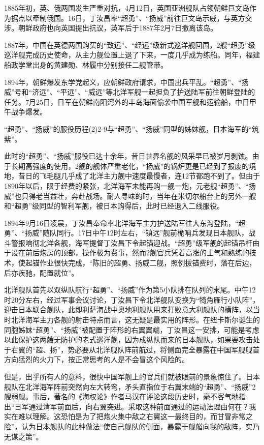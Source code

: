 \documentclass[12pt,UTF8]{ctexbook}
\begin{document}
1885年初，英、俄两国发生严重对抗，4月12日，英国亚洲舰队占领朝鲜巨文岛作为据点以牵制俄国。16日，丁汝昌率“超勇”、“扬威”前往巨文岛示威，与英方交涉。朝鲜政府也向英国提出抗议，英军后于1887年2月7日撤离该岛。

1887年，中国在英德两国购买的“致远”、“经远”级新式巡洋舰回国，2艘“超勇”级巡洋舰完成历史使命，从主力舰位置上退了下来，一度几乎成为练船。同年，福建船政学堂出身的黄建勋、林履中分别接任二舰管带。

1894年，朝鲜爆发东学党起义，应朝鲜政府请求，中国出兵平乱。“超勇”、“扬威”号和“济远”、“平远”、“威远”等北洋军舰一起担负了护送陆军前往朝鲜登陆的任务。7月25日，日军在朝鲜南阳湾外的丰岛海面偷袭中国军舰和运输船，中日甲午战争爆发。

“超勇”、“扬威”的服役历程(2)2-9与“超勇”、“扬威”同型的姊妹舰，日本海军的“筑紫”。

此时的“超勇”、“扬威”服役已达十余年，昔日世界名舰的风采早已被岁月剥蚀。由于长期高强度的使用，2舰的舰体严重老化，“扬威”的锅炉更是已经到了报废的境地，昔日的飞毛腿几乎成了北洋主力舰中速度最慢者，连12节都跑不到了。但由于1890年以后，限于经费的紧张，北洋海军未能再购一舰一炮，元老舰“超勇”、“扬威”也只得老当益壮，奔赴战场。耐人寻味的时，当年在米切尔船台上的另外一艘和“超勇”级同型的智利军舰，被日本购得后，此时已经退入二线服役。

1894年9月16日凌晨，丁汝昌奉命率北洋海军主力护送陆军往大东沟登陆，“超勇”、“扬威”随队同行。17日中午12时左右，“镇远”舰前桅哨兵发现日本舰队，战斗警报响彻北洋各舰，海军提督丁汝昌下令起锚迎战。“超勇”级军舰的起锚吊杆由于设在前后炮房的顶部，操作极为费事，然而2舰官兵凭着高涨的士气和熟练的技术，使起锚作业很快完成，“陈旧的超勇、扬威二舰，照例拔锚费时，落在后边，后亦疾驰，配置就位”。

北洋舰队首先以双纵队航行“超勇”、“扬威”作为第5小队排在队列的末尾。中午12时20分左右，经过军事会议讨论，丁汝昌下令北洋舰队变换为“犄角雁行小队阵”，迎击日本联合舰队，此即利萨海战中奥地利舰队用来打败意大利舰队的横阵，以当时北洋海军主力各舰的射击特点而言，这无疑是最实用的阵形。在纽卡斯尔诞生的同胞姊妹“超勇”、“扬威”被配置于阵形的右翼翼端，丁汝昌这一安排，可能是考虑以此保护这两艘无防护的老式巡洋舰，因为成纵队而来的日本舰队，如果要攻击处于右翼的“超、扬”，势必要从北洋舰队阵前航过，将侧面完全暴露在中国军舰舰首方向猛烈的火力下，按正常思考的人是不会冒这个风险的。

但是，出乎所有人的意料，很快中国军舰上的官兵们就被眼前的景象惊住了。日本舰队在北洋海军阵前突然向左大转弯，矛头直指位于右翼末端的“超勇”、“扬威”2艘弱舰。事后，著名的《海权论》作者马汉在评论这段历史时，毫不客气地指出“日军通过清军前面后，向右翼突进。采取这种前面通过的运动法理由何在？我实在难以理解。这恐怕是为了把炮火集中敌之右翼这一最终目的，而甘冒非常之险”，认为日本舰队的此种做法“使自己舰队的侧面，暴露于舰艏向我的敌阵，实乃无谋之策”。
\end{document}
